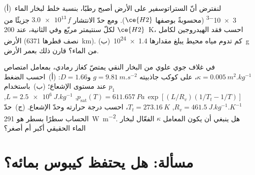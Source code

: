 \begin{exercise}[$\star\star\star$]\label{exo:b3:planetary-atmospheres:11}
(أ)~لنفترض أنّ الستراتوسفير على الأرض أصبح رطبًا، بنسبة خلط لبخار الماء
\num{3e-3} (محسوبةً بوصفها $\ce{H2}$). ومع
حدّ الانتشار $\num{3.0e13}\,f$ جزيئًا من $\ce{H2}$ لكلّ سنتيمتر مربّع
وفي الثانية، عند \qty{200}{K}، احسب فقد الهيدروجين لكامل الأرض
(نصف قطرها \qty{6371}{km}). (ب)~كم تدوم مياه محيط يبلغ مقدارها
\qty{1.4e24}{g} من الماء؟ قارن ذلك بعمر الأرض.
\end{exercise}

\begin{exercise}[$\star\star\star$]\label{exo:b3:planetary-atmospheres:12}
في غلاف جوي علوي من البخار النقي يمتصّ كغاز رمادي، بمعامل امتصاص $\kappa =
\qty{0.005}{m^2.kg^{-1}}$، على كوكب جاذبيته $g = \qty{9.81}{m.s^{-2}}$
و$D = 1.66$: (أ)~احسب الضغط $p_1$ عند مستوى الإشعاع؛
(ب)~باستخدام $p_\mathrm{sat}(T) = \qty{611.657}{Pa}\,\exp[(L/R_v)(1/T_t -
1/T)]$, $L = \qty{2.5e6}{J.kg^{-1}}$, $R_v = \qty{461.5}{J.kg^{-1}.K^{-1}}$,
$T_t = \qty{273.16}{K}$، احسب درجة حرارته وحدّ الإشعاع.
(ج)~حدّ الحساب سطرًا بسطر هو \qty{291}{W.m^{-2}}. هل ينبغي أن يكون المعامل
$\kappa$ الفعّال لبخار الماء الحقيقي أكبر أم أصغر؟
\end{exercise}

\section{مسألة: هل يحتفظ كيبوس بمائه؟}

